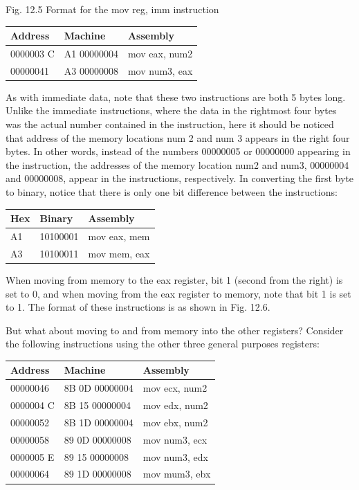 \documentclass[10pt]{book}
\begin{document}
Fig. 12.5 Format for the mov reg, imm instruction

\begin{center}
\begin{tabular}{|l|l|l|}
\hline
Address & Machine & Assembly \\
\hline
0000003 C & A1 00000004 & mov eax, num2 \\
\hline
00000041 & A3 00000008 & mov num3, eax \\
\hline
\end{tabular}
\end{center}

As with immediate data, note that these two instructions are both 5 bytes long. Unlike the immediate instructions, where the data in the rightmost four bytes was the actual number contained in the instruction, here it should be noticed that address of the memory locations num 2 and num 3 appears in the right four bytes. In other words, instead of the numbers 00000005 or 00000000 appearing in the instruction, the addresses of the memory location num2 and num3, 00000004 and 00000008, appear in the instructions, respectively. In converting the first byte to binary, notice that there is only one bit difference between the instructions:

\begin{center}
\begin{tabular}{|l|l|l|}
\hline
Hex & Binary & Assembly \\
\hline
A1 & 10100001 & mov eax, mem \\
\hline
A3 & 10100011 & mov mem, eax \\
\hline
\end{tabular}
\end{center}

When moving from memory to the eax register, bit 1 (second from the right) is set to 0, and when moving from the eax register to memory, note that bit 1 is set to 1. The format of these instructions is as shown in Fig. 12.6.

But what about moving to and from memory into the other registers? Consider the following instructions using the other three general purposes registers:

\begin{center}
\begin{tabular}{|l|l|l|}
\hline
Address & Machine & Assembly \\
\hline
00000046 & 8B 0D 00000004 & mov ecx, num2 \\
\hline
0000004 C & 8B 15 00000004 & mov edx, num2 \\
\hline
00000052 & 8B 1D 00000004 & mov ebx, num2 \\
\hline
00000058 & 89 0D 00000008 & mov num3, ecx \\
\hline
0000005 E & 89 15 00000008 & mov num3, edx \\
\hline
00000064 & 89 1D 00000008 & mov mum3, ebx \\
\hline
\end{tabular}
\end{center}
\end{document}
